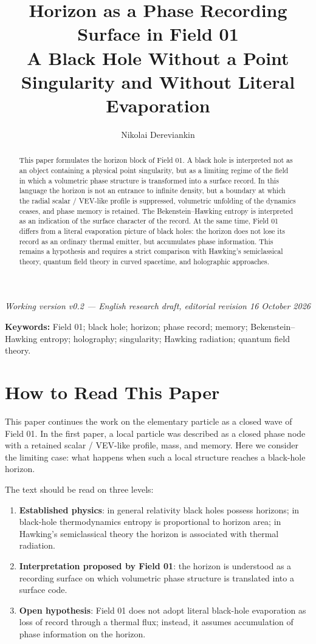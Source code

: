 \documentclass[11pt,a4paper]{article}
\title{Horizon as a Phase Recording Surface in Field 01\\\large A Black Hole Without a Point Singularity and Without Literal Evaporation}
\author{Nikolai Dereviankin}
\date{}
\begin{document}
\maketitle

\begin{center}
\textit{Working version v0.2 --- English research draft, editorial revision 16 October 2026}
\end{center}

\begin{abstract}
This paper formulates the horizon block of Field 01. A black hole is interpreted not as an object containing a physical point singularity, but as a limiting regime of the field in which a volumetric phase structure is transformed into a surface record. In this language the horizon is not an entrance to infinite density, but a boundary at which the radial scalar / VEV-like profile is suppressed, volumetric unfolding of the dynamics ceases, and phase memory is retained. The Bekenstein--Hawking entropy is interpreted as an indication of the surface character of the record. At the same time, Field 01 differs from a literal evaporation picture of black holes: the horizon does not lose its record as an ordinary thermal emitter, but accumulates phase information. This remains a hypothesis and requires a strict comparison with Hawking's semiclassical theory, quantum field theory in curved spacetime, and holographic approaches.
\end{abstract}

\textbf{Keywords:} Field 01; black hole; horizon; phase record; memory; Bekenstein--Hawking entropy; holography; singularity; Hawking radiation; quantum field theory.

\section{How to Read This Paper}

This paper continues the work on the elementary particle as a closed wave of Field 01. In the first paper, a local particle was described as a closed phase node with a retained scalar / VEV-like profile, mass, and memory. Here we consider the limiting case: what happens when such a local structure reaches a black-hole horizon.

The text should be read on three levels:
\begin{enumerate}
\item \textbf{Established physics}: in general relativity black holes possess horizons; in black-hole thermodynamics entropy is proportional to horizon area; in Hawking's semiclassical theory the horizon is associated with thermal radiation.
\item \textbf{Interpretation proposed by Field 01}: the horizon is understood as a recording surface on which volumetric phase structure is translated into a surface code.
\item \textbf{Open hypothesis}: Field 01 does not adopt literal black-hole evaporation as loss of record through a thermal flux; instead, it assumes accumulation of phase information on the horizon.
\end{enumerate}
\end{document}

